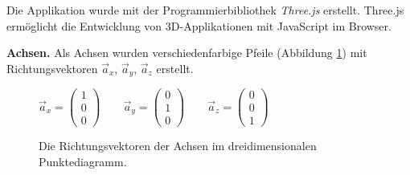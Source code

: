 Die Applikation wurde mit der Programmierbibliothek \textit{Three.js} erstellt. Three.js ermöglicht die Entwicklung von 3D-Applikationen mit JavaScript im Browser.

\textbf{Achsen.} Als Achsen wurden verschiedenfarbige Pfeile (Abbildung \ref{fig:vectors}) mit Richtungsvektoren $\vec{a}_x$, $\vec{a}_y$, $\vec{a}_z$ erstellt.

\begin{figure}[!htbp]
	\centering
	\begin{math}
		\vec{a}_x=\begin{pmatrix} 1 \\ 0 \\ 0 \end{pmatrix} \qquad
		\vec{a}_y=\begin{pmatrix} 0 \\ 1 \\ 0 \end{pmatrix} \qquad
		\vec{a}_z=\begin{pmatrix} 0 \\ 0 \\ 1 \end{pmatrix} \qquad
	\end{math}
	\caption{Die Richtungsvektoren der Achsen im dreidimensionalen Punktediagramm.}
	\label{fig:vectors}
\end{figure}
